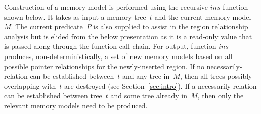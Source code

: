 Construction of a memory model is performed
using the recursive $\mathit{ins}$ function shown below.
It takes as input a memory tree~$t$ and the current memory model~$M$.
The current predicate~$P$ is also supplied
to assist in the region relationship analysis
but is elided from the below presentation as it is a read-only value
that is passed along through the function call chain.
For output, function $\mathit{ins}$ produces, non-deterministically,
a set of new memory models based on all possible pointer relationships
for the newly-inserted region.
If no necessarily-relation can be established between~$t$ and any tree in~$M$, then all trees possibly overlapping with~$t$ are destroyed (see Section~\ref{sec:intro}).
If a necessarily-relation can be established between tree~$t$ and some tree already in~$M$, then only the relevant memory models need to be produced.

